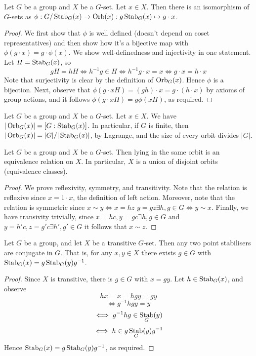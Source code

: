 \begin{theorem}
  Let $G$ be a group and $X$ be a $G$-set. Let $x\in X$. Then there is an isomorphism of
  $G$-sets as $\phi:G/\operatorname*{Stab}_{G}(x)\to \operatorname*{Orb}(x):g\operatorname*{Stab}_G(x)\mapsto g\cdot x$.
  \label{thm:orbStab}
\end{theorem}
\begin{proof}
  We first show that $\phi$ is well defined (doesn't depend on coset representatives) and
  then show how it's a bijective map with $\phi(g\cdot x)=g\cdot \phi(x)$. We show
  well-definedness and injectivity in one statement. Let $H=\operatorname*{Stab}_G(x)$, so
  \[gH=hH \iff h^{-1}g\in H \iff h^{-1}g \cdot x = x \iff g\cdot x = h\cdot x\]
  Note that surjectivity is clear by the definition of $\operatorname*{Orb}_G(x)$. Hence $\phi$ is a
  bijection. Next, observe that $\phi(g\cdot xH)=(gh)\cdot x = g\cdot (h\cdot x)$ by
  axioms of group actions, and it follows $\phi(g\cdot xH)=g\phi(xH)$, as required.
\end{proof}


\begin{corollary}
  Let $G$ be a group and $X$ be a $G$-set. Let $x\in X$. We have $|\operatorname*{Orb}_{G}(x)|=
  [G:\operatorname*{Stab}_G(x)]$. In particular, if $G$ is finite, then $|\operatorname*{Orb}_{G}(x)|=|G|/|\operatorname*{Stab}_G(x)|$,
  by Lagrange, and the size of every orbit divides $|G|$.
  \label{cor:orbStab}
\end{corollary}


\begin{theorem}
  Let $G$ be a group and $X$ be a $G$-set. Then lying in the same orbit is an equivalence
  relation on $X$. In particular, $X$ is a union of disjoint orbits (equivalence classes).
  \label{thm:eqRelOrb}
\end{theorem}
\begin{proof}
  We prove reflexivity, symmetry, and transitivity. Note that the relation is reflexive
  since $x=1\cdot x$, the definition of left action. Moreover, note that the relation is
  symmetric since $x\sim y \iff x=hz$ $y=gz\exists h,g\in G \iff y\sim x$. Finally, we
  have transivity trivially, since $x=hc,y=gc\exists h,g\in G$ and $y=h'c,z=g'c\exists
  h',g'\in G$ it follows that $x\sim z$.
\end{proof}


\begin{theorem}
  Let $G$ be a group, and let $X$ be a transitive $G$-set. Then any two point stabilisers are
  conjugate in $G$. That is, for any $x,y\in X$ there exists $g\in G$ with
  $\operatorname*{Stab}_G(x)=g\operatorname*{Stab}_G(y)g^{-1}$.
  \label{<+label+>}
\end{theorem}
\begin{proof}
  Since $X$ is transitive, there is $g\in G$ with $x=gy$. Let $h\in\operatorname*{Stab}_G(x)$, and
  observe
  \[hx=x=hgy=gy\]
  \[\iff g^{-1}hgy = y\]
  \[\iff g^{-1}hg\in\operatorname*{Stab}_G(y)\]
  \[\iff h\in g\operatorname*{Stab}_G(y)g^{-1}\]
  Hence $\operatorname*{Stab}_G(x)=g\operatorname*{Stab}_G(y)g^{-1}$, as required.
\end{proof}


